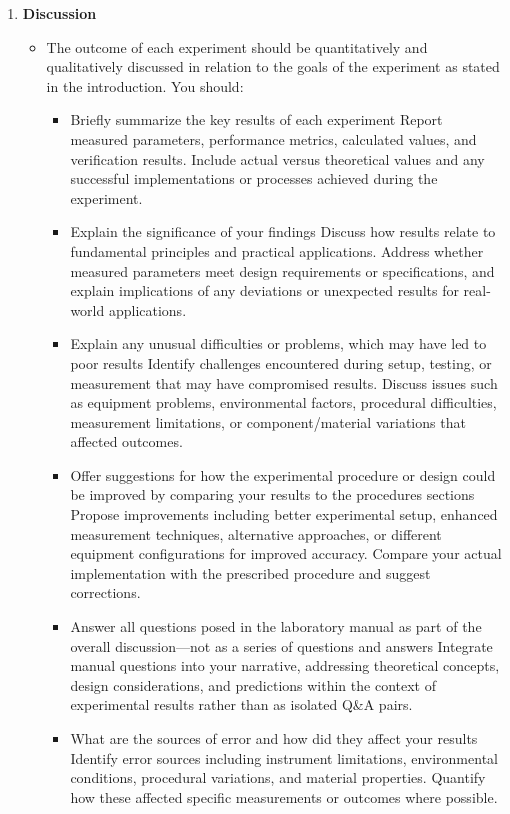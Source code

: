 \documentclass[12pt]{article}
\begin{document}
\begin{enumerate}
\item \textbf{Discussion}
\begin{itemize}
\item The outcome of each experiment should be quantitatively and qualitatively discussed in relation to the goals of the experiment as stated in the introduction. You should:
\begin{itemize}
\item Briefly summarize the key results of each experiment Report measured parameters, performance metrics, calculated values, and verification results. Include actual versus theoretical values and any successful implementations or processes achieved during the experiment.
\item Explain the significance of your findings Discuss how results relate to fundamental principles and practical applications. Address whether measured parameters meet design requirements or specifications, and explain implications of any deviations or unexpected results for real-world applications.
\item Explain any unusual difficulties or problems, which may have led to poor results Identify challenges encountered during setup, testing, or measurement that may have compromised results. Discuss issues such as equipment problems, environmental factors, procedural difficulties, measurement limitations, or component/material variations that affected outcomes.
\item Offer suggestions for how the experimental procedure or design could be improved by comparing your results to the procedures sections Propose improvements including better experimental setup, enhanced measurement techniques, alternative approaches, or different equipment configurations for improved accuracy. Compare your actual implementation with the prescribed procedure and suggest corrections.
\item Answer all questions posed in the laboratory manual as part of the overall discussion—not as a series of questions and answers Integrate manual questions into your narrative, addressing theoretical concepts, design considerations, and predictions within the context of experimental results rather than as isolated Q\&A pairs.
\item What are the sources of error and how did they affect your results Identify error sources including instrument limitations, environmental conditions, procedural variations, and material properties. Quantify how these affected specific measurements or outcomes where possible.

\end{itemize}
\end{itemize}
\end{enumerate}
\end{document}
